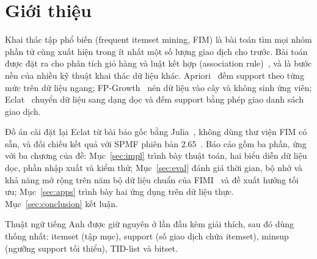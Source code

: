 \section{Giới thiệu}
\label{sec:intro}

Khai thác tập phổ biến (frequent itemset mining, FIM) là bài toán tìm mọi nhóm phần tử cùng xuất hiện trong
ít nhất một số lượng giao dịch cho trước. Bài toán được đặt ra cho phân tích giỏ hàng và luật kết hợp
(association rule)~\cite{agrawal1993mining}, và là bước nền của nhiều kỹ thuật khai thác dữ liệu khác.
Apriori~\cite{agrawal1994fast} đếm support theo từng mức trên dữ liệu ngang; FP-Growth~\cite{han2000mining}
nén dữ liệu vào cây và không sinh ứng viên; Eclat~\cite{zaki2000scalable} chuyển dữ liệu sang dạng dọc và
đếm support bằng phép giao danh sách giao dịch.

Đồ án cài đặt lại Eclat từ bài báo gốc bằng Julia~\cite{bezanson2017julia}, không dùng thư viện FIM có sẵn,
và đối chiếu kết quả với SPMF phiên bản 2.65~\cite{spmfsite}. Báo cáo gồm ba phần, ứng với ba chương của đề:
Mục~\ref{sec:impl} trình bày thuật toán, hai biểu diễn dữ liệu dọc, phần nhập xuất và kiểm thử;
Mục~\ref{sec:eval} đánh giá thời gian, bộ nhớ và khả năng mở rộng trên năm bộ dữ liệu chuẩn của
FIMI~\cite{goethals2003fimi} và đề xuất hướng tối ưu; Mục~\ref{sec:apps} trình bày hai ứng dụng trên dữ liệu
thực. Mục~\ref{sec:conclusion} kết luận.

Thuật ngữ tiếng Anh được giữ nguyên ở lần đầu kèm giải thích, sau đó dùng thống nhất: itemset (tập mục),
support (số giao dịch chứa itemset), minsup (ngưỡng support tối thiểu), TID-list và bitset.
